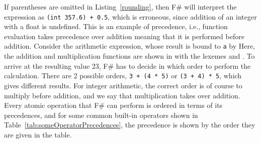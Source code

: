 If parentheses are omitted in Listing~\ref{rounding}, then F\# will interpret the expression as \lstinline|(int 357.6) + 0.5|, which is erroneous, since addition of an integer with a float is undefined. This is an example of precedence, i.e., function evaluation takes precedence over addition meaning that it is performed before addition. Consider the arithmetic expression, whose result is bound to \lstinline|a| by
%
Here, the addition and multiplication functions are shown in  with the  lexemes \lexeme{+} and \lexeme{*}. To arrive at the resulting value 23, F\# has to decide in which order to perform the calculation. There are 2 possible orders, \lstinline|3 + (4 * 5)| or \lstinline|(3 + 4) * 5|, which gives different results. For integer arithmetic, the correct order is of course to multiply before addition, and we say that multiplication takes  over addition. Every atomic operation that F\# can perform is ordered in terms of its precedences, and for some common built-in operators shown in Table~\ref{tab:someOperatorPrecedences}, the precedence is shown by the order they are given in the table.
